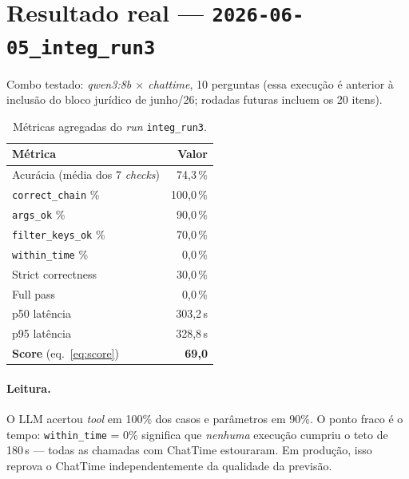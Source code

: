\documentclass[11pt,a4paper]{article}
\newcommand{\code}[1]{\texttt{\small #1}}
\begin{document}
\section{Resultado real --- \texttt{2026-06-05\_integ\_run3}}

Combo testado: \emph{qwen3:8b $\times$ chattime}, 10 perguntas (essa
execução é anterior à inclusão do bloco jurídico de junho/26; rodadas
futuras incluem os 20 itens).

\begin{table}[h!]
\centering
\begin{tabular}{@{}l r@{}}
\toprule
\textbf{Métrica} & \textbf{Valor} \\
\midrule
Acurácia (média dos 7 \emph{checks}) & 74{,}3\,\% \\
\code{correct\_chain} \%               & 100{,}0\,\% \\
\code{args\_ok} \%                     & 90{,}0\,\% \\
\code{filter\_keys\_ok} \%             & 70{,}0\,\% \\
\code{within\_time} \%                 & 0{,}0\,\% \\
Strict correctness                    & 30{,}0\,\% \\
Full pass                             & 0{,}0\,\% \\
p50 latência                          & 303{,}2\,s \\
p95 latência                          & 328{,}8\,s \\
\textbf{Score} (eq.~\ref{eq:score})    & \textbf{69{,}0} \\
\bottomrule
\end{tabular}
\caption{Métricas agregadas do \emph{run} \code{integ\_run3}.}
\end{table}

\paragraph{Leitura.} O LLM acertou \emph{tool} em 100\% dos casos e
parâmetros em 90\%. O ponto fraco é o tempo: \code{within\_time} = 0\%
significa que \emph{nenhuma} execução cumpriu o teto de 180\,s --- todas
as chamadas com ChatTime estouraram. Em produção, isso reprova o
ChatTime independentemente da qualidade da previsão.
\end{document}
